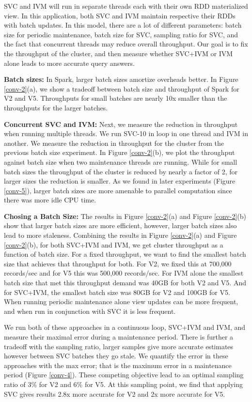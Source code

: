 SVC and IVM will run in separate threads each with their own RDD materialized view.
In this application, both SVC and IVM maintain respective their RDDs with batch updates.
In this model, there are a lot of different parameters: batch size for periodic maintenance, batch size for SVC, sampling ratio for SVC, and the fact that concurrent threads may reduce overall throughput.
Our goal is to fix the throughput of the cluster, and then measure whether SVC+IVM or IVM alone leads to more accurate query answers.

\textbf{Batch sizes:} In Spark, larger batch sizes amortize overheads better.
In Figure \ref{conv-2}(a), we show a tradeoff between batch size and throughput of Spark for V2 and V5.
Throughputs for small batches are nearly 10x smaller than the throughputs for the larger batches. 

\textbf{Concurrent SVC and IVM:} Next, we measure the reduction in throughput when running multiple threads.
We run SVC-10 in loop in one thread and IVM in another.
We measure the reduction in throughput for the cluster from the previous batch size experiment.
In Figure \ref{conv-2}(b), we plot the throughput against batch size when two maintenance threads are running.
While for small batch sizes the throughput of the cluster is reduced by nearly a factor of 2, for larger sizes the reduction is
smaller.
As we found in later experiments (Figure \ref{conv-5}), larger batch sizes are more amenable to parallel computation since there was more idle CPU time.

\textbf{Chosing a Batch Size:}
The results in Figure \ref{conv-2}(a) and Figure \ref{conv-2}(b) show that larger batch sizes are more efficient, however, larger batch sizes also lead to more staleness.
Combining the results in Figure \ref{conv-2}(a) and Figure \ref{conv-2}(b), for both SVC+IVM and IVM, we get cluster throughput as a function of batch size.
For a fixed throughput, we want to find the smallest batch size that achieves that throughput for both.
For V2, we fixed this at 700,000 records/sec and for V5 this was 500,000 records/sec.
For IVM alone the smallest batch size that met this throughput demand was 40GB for both V2 and V5.
And for SVC+IVM, the smallest batch size was 80GB for V2 and 100GB for V5. 
When running periodic maintenance alone view updates can be more frequent, and when run in conjunction with SVC it is less frequent. 

We run both of these approaches in a continuous loop, SVC+IVM and IVM, and measure their maximal error during a maintenance period.
There is further a tradeoff with the sampling ratio, larger samples give more accurate estimates however between SVC batches they go stale.
We quantify the error in these approaches with the max error; that is the maximum error in a maintenance period (Figure \ref{conv-4}).
These competing objective lead to an optimal sampling ratio of 3\% for V2 and 6\% for V5.
At this sampling point, we find that applying SVC gives results 2.8x more accurate for V2 and 2x more accurate for V5.

